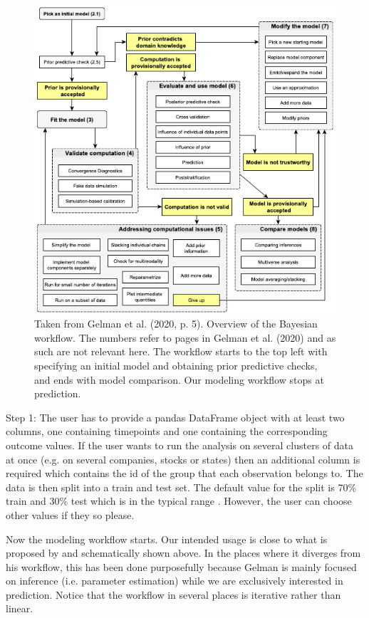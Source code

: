 \documentclass{article}
\begin{document}
\begin{figure}[H]
    \centerline{\includegraphics[scale = 0.5]{images/Gelman.png}}
    \caption{Taken from Gelman et al. (2020, p. 5). Overview of the Bayesian workflow. The numbers refer to pages in Gelman et al. (2020) and as such are not relevant here. The workflow starts to the top left with specifying an initial model and obtaining prior predictive checks, and ends with model comparison. Our modeling workflow stops at prediction. }
\end{figure}

\noindent Step 1: The user has to provide a pandas DataFrame object with at least two columns, one containing timepoints and one containing the corresponding outcome values. If the user wants to run the analysis on several clusters of data at once (e.g. on several companies, stocks or states) then an additional column is required which contains the id of the group that each observation belongs to. The data is then split into a train and test set. The default value for the split is 70\% train and 30\% test which is in the typical range \cite{Brownlee}. However, the user can choose other values if they so please.

\noindent Now the modeling workflow starts. Our intended usage is close to what is proposed by  and schematically shown above. In the places where it diverges from his workflow, this has been done purposefully because Gelman is mainly focused on inference (i.e. parameter estimation) while we are exclusively interested in prediction. Notice that the workflow in several places is iterative rather than linear.
\end{document}
